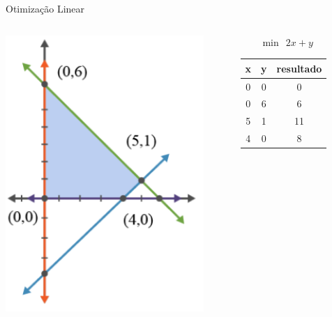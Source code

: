 \documentclass[compress]{beamer}
\begin{document}

\begin{frame}{Otimização Linear}

\begin{columns}[T]
    \begin{column}{.58\textwidth}
        \centering \includegraphics[width=0.9\textwidth]{images/modelo_pl.png}
    \end{column}
    \begin{column}{.4\textwidth}
        \vspace{2cm}
        \qquad~~~~$\min~~2x + y$
        \vspace{0.2cm}
        \begin{table}[]
            \centering
            \begin{tabular}{@{}ccc@{}}
            \toprule
            \textbf{x} & \textbf{y} & \textbf{resultado} \\ \midrule
            0          & 0          & 0     \\
            0          & 6          & 6     \\
            5          & 1          & 11    \\
            4          & 0          & 8     \\ \bottomrule
            \end{tabular}%
        \end{table}
    \end{column}
\end{columns}

\end{frame}
\end{document}
